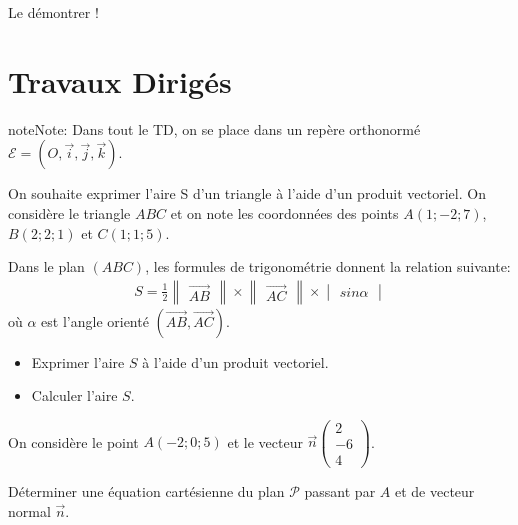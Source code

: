 \documentclass[letterpaper,10pt,english]{jupyterBook}
\begin{document}
\sphinxAtStartPar
{} Le démontrer !


\chapter{Travaux Dirigés}
\label{\detokenize{Part1/TD:travaux-diriges}}\label{\detokenize{Part1/TD::doc}}
\begin{sphinxadmonition}{note}{Note:}
\sphinxAtStartPar
Dans tout le TD, on se place dans un repère orthonormé \(\mathcal{E} = (O,\vec{i},\vec{j},\vec{k})\).
\end{sphinxadmonition}

\sphinxAtStartPar
{} On souhaite exprimer l’aire S d’un triangle à l’aide d’un produit vectoriel. On considère le triangle \(ABC\) et on note les coordonnées des points \(A(1;-2;7)\), \(B(2;2;1)\) et \(C(1;1;5)\).

\sphinxAtStartPar
Dans le plan \((ABC)\), les formules de trigonométrie donnent la relation suivante:
\begin{equation*}
\begin{split}
S=\frac{1}{2}\begin{Vmatrix}\vec{AB}\end{Vmatrix} \times \begin{Vmatrix}\vec{AC}\end{Vmatrix} \times \begin{vmatrix}sin\alpha\end{vmatrix}
\end{split}
\end{equation*}
\sphinxAtStartPar
où \(\alpha\) est l’angle orienté \((\vec{AB},\vec{AC})\).
\begin{itemize}
\item {} 
\sphinxAtStartPar
Exprimer l’aire \(S\) à l’aide d’un produit vectoriel.

\item {} 
\sphinxAtStartPar
Calculer l’aire \(S\).

\end{itemize}

\sphinxAtStartPar
{} On considère le point \(A(-2;0;5)\) et le vecteur \(\vec{n}\begin{pmatrix}
2\\-6\\4
\end{pmatrix}\).

\sphinxAtStartPar
Déterminer une équation cartésienne du plan \(\mathcal{P}\) passant par \(A\) et de vecteur normal \(\vec{n}\).
\end{document}
